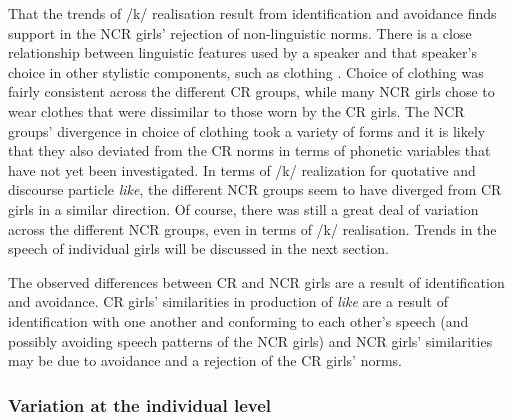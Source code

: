 That the trends of /k/ realisation result from identification and avoidance finds support in the NCR girls' rejection of non-linguistic norms.  There is a close relationship between linguistic features used by a speaker and that speaker's choice in other stylistic components, such as clothing \cite[89]{bourdieu1991}. Choice of clothing was fairly consistent across the different CR groups, while many NCR girls chose to wear clothes that were dissimilar to those worn by the CR girls.  The NCR groups' divergence in choice of clothing took a variety of forms and it is likely that they also deviated from the CR norms in terms of phonetic variables that have not yet been investigated.  In terms of /k/ realization for quotative and discourse particle \textit{like}, the different NCR groups seem to have diverged from CR girls in a similar direction.  Of course, there was still a great deal of variation across the different NCR groups, even in terms of /k/ realisation.  Trends in the speech of individual girls will be discussed in the next section.

The observed differences between CR and NCR girls are a result of identification and avoidance.  CR girls' similarities in production of \textit{like} are a result of identification with one another and conforming to each other's speech (and possibly avoiding speech patterns of the NCR girls) and NCR girls' similarities may be due to avoidance and a rejection of the CR girls' norms.




\subsubsection{Variation at the individual level}\label{theindividual}

